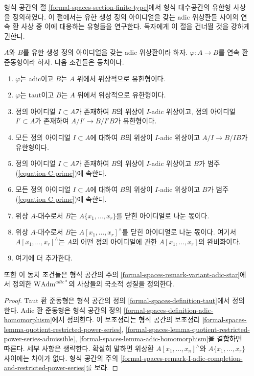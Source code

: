 \noindent
형식 공간의 절 \ref{formal-spaces-section-finite-type}에서
형식 대수공간의 유한형 사상을 정의하였다.
이 절에서는 유한 생성 정의 아이디얼을 갖는 adic 위상환들 사이의
연속 환 사상 중 이에 대응하는 유형들을 연구한다.
독자에게 이 절을 건너뛸 것을 강하게 권한다.

\begin{lemma}
\label{lemma-finite-type}
$A$와 $B$를 유한 생성 정의 아이디얼을 갖는 adic 위상환이라 하자.
$\varphi : A \to B$를 연속 환 준동형이라 하자. 다음 조건들은 동치이다.
\begin{enumerate}
\item $\varphi$는 adic이고 $B$는 $A$ 위에서 위상적으로 유한형이다.
\item $\varphi$는 taut이고 $B$는 $A$ 위에서 위상적으로 유한형이다.
\item 정의 아이디얼 $I \subset A$가 존재하여 $B$의 위상이
$I$-adic 위상이고, 정의 아이디얼 $I' \subset A$가 존재하여
$A/I' \to B/I'B$가 유한형이다.
\item 모든 정의 아이디얼 $I \subset A$에 대하여 $B$의 위상이
$I$-adic 위상이고 $A/I \to B/IB$가 유한형이다.
\item 정의 아이디얼 $I \subset A$가 존재하여 $B$의 위상이
$I$-adic 위상이고 $B$가 범주 (\ref{equation-C-prime})에 속한다.
\item 모든 정의 아이디얼 $I \subset A$에 대하여 $B$의 위상이
$I$-adic 위상이고 $B$가 범주 (\ref{equation-C-prime})에 속한다.
\item 위상 $A$-대수로서 $B$는 $A\{x_1, \ldots, x_r\}$를
닫힌 아이디얼로 나눈 몫이다.
\item 위상 $A$-대수로서 $B$는 $A[x_1, \ldots, x_r]^\wedge$를
닫힌 아이디얼로 나눈 몫이다. 여기서
$A[x_1, \ldots, x_r]^\wedge$는 $A$의 어떤 정의 아이디얼에 관한
$A[x_1, \ldots, x_r]$의 완비화이다.
\item 여기에 더 추가한다.
\end{enumerate}
또한 이 동치 조건들은 형식 공간의 주의
\ref{formal-spaces-remark-variant-adic-star}에서 정의한
$\text{WAdm}^{adic*}$의 사상들의 국소적 성질을 정의한다.
\end{lemma}

\begin{proof}
Taut 환 준동형은 형식 공간의 정의
\ref{formal-spaces-definition-taut}에서 정의한다.
Adic 환 준동형은 형식 공간의 정의
\ref{formal-spaces-definition-adic-homomorphism}에서 정의한다.
이 보조정리는 형식 공간의 보조정리
\ref{formal-spaces-lemma-quotient-restricted-power-series},
\ref{formal-spaces-lemma-quotient-restricted-power-series-admissible},
\ref{formal-spaces-lemma-adic-homomorphism}을 결합하면 따른다.
세부 사항은 생략한다. 확실히 말하면 위상환
$A[x_1, \ldots, x_n]^\wedge$와 $A\{x_1, \ldots, x_r\}$ 사이에는
차이가 없다. 형식 공간의 주의
\ref{formal-spaces-remark-I-adic-completion-and-restricted-power-series}를 보라.
\end{proof}

